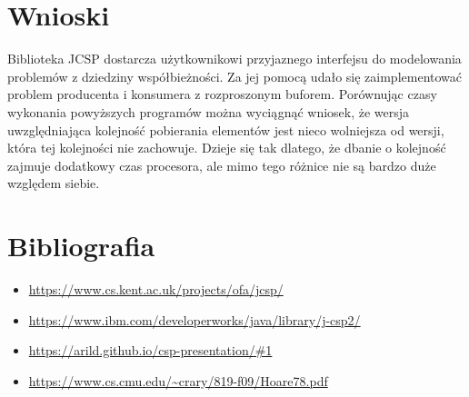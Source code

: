 \documentclass[12pt]{article}
\begin{document}
\section{Wnioski}
Biblioteka JCSP dostarcza użytkownikowi przyjaznego interfejsu do modelowania problemów z dziedziny współbieżności. Za jej pomocą udało się zaimplementować problem producenta i konsumera z rozproszonym buforem. Porównując czasy wykonania powyższych programów można wyciągnąć wniosek, że wersja uwzględniająca kolejność pobierania elementów jest nieco wolniejsza od wersji, która tej kolejności nie zachowuje. Dzieje się tak dlatego, że dbanie o kolejność zajmuje dodatkowy czas procesora, ale mimo tego różnice nie są bardzo duże względem siebie.

\section{Bibliografia}
\begin{itemize}
    \item \url{https://www.cs.kent.ac.uk/projects/ofa/jcsp/}
    \item \url{https://www.ibm.com/developerworks/java/library/j-csp2/}
    \item \url{https://arild.github.io/csp-presentation/#1}
    \item \url{https://www.cs.cmu.edu/~crary/819-f09/Hoare78.pdf}
\end{itemize}
\end{document}
